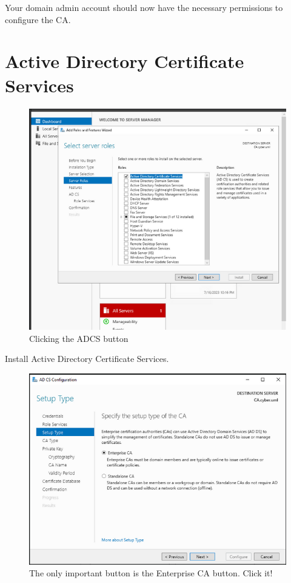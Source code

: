 \documentclass{article}
\begin{document}
Your domain admin account should now have the necessary permissions to configure the CA.

\section{Active Directory Certificate Services}

\begin{figure}[H]
        \centering
        \includegraphics[width=1\textwidth]{ServerManager.png}
        \caption{Clicking the ADCS button}
        \label{fig:ADCS}
\end{figure}

Install Active Directory Certificate Services.


\begin{figure}[H]
        \centering
        \includegraphics[width=1\textwidth]{EnterpriseCA.png}
        \caption{The only important button is the Enterprise CA button. Click it!}
        \label{fig:EnterpriseCA}
\end{figure}
\end{document}
